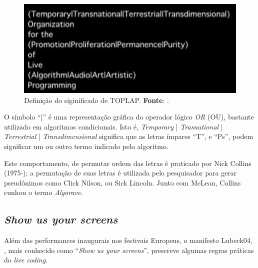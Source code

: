 \begin{figure}[!h]
  \centering
  \includegraphics[scale=0.5]{imagens/TOPLAP.png}
  \caption{Definição do siginificado de TOPLAP. \textbf{Fonte}: .}
  \label{fig:TOPLAP}
\end{figure}

O símbolo ``|'' é uma representação gráfica do operador lógico \emph{OR} (OU), bastante utilizado em algoritmos condicionais. Isto é, \emph{Temporary }| \emph{Trasnational} | \emph{Terrestrial} | \emph{Transdimensional} significa que as letras ímpares ``T'', e ``Ps'', podem significar um ou outro termo indicado pelo algoritmo.

Este comportamento, de permutar ordem das letras é praticado por Nick Collins (1975-); a permutação de suas letras é utilizada pelo pesquisador para gerar pseudônimos como Click Nilson, ou Sick Lincoln. Junto com McLean, Collins cunhou o termo \emph{Algorave}.

\subsection{\emph{Show us your screens}}\label{sec:showusyourscreens}

Além das performances inaugurais nos festivais Europeus, o manifesto Lubeck04, , mais conhecido como ``\emph{Show us your screens}'', prescreve algumas regras práticas do \emph{live coding}. 

